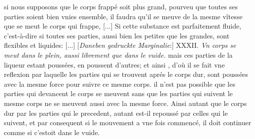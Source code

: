 si nous supposons que le corps frapp\'{e} soit plus grand, pourveu que toutes ses parties soient bien vnies ensemble, il faudra qu'il se meuve de la mesme v\^{i}tesse que se meut le corps qui frappe, [...]
\pend 
\count{}
\pstart 
[p. 76] Si cette substance est parfaitement fluide, c'est-\`{a}-dire si toutes ses parties, aussi bien les petites que les grandes, sont flexibles et liquides: [...] [\textit{Daneben gedruckte Marginalie}:] XXXII. \textit{Vn corps se meut dans le plein, aussi librement que dans le vuide.}
\pend 
\pstart  
[p. 77] [...] mais ces parties de la liqueur estant pouss\'{e}es, en poussent d'autres; et ainsi , d'o\`{u} il se fait vne reflexion par laquelle les parties qui se trouvent apr\'{e}s le corps dur, sont pouss\'{e}es avec la mesme force pour suivre ce mesme corps.
\pend 
\pstart  
[p. 78] [...] il n'est pas possible que les parties qui devancent le corps se meuvent sans que les parties qui suivent le mesme corps ne se meuvent aussi avec la mesme force. Ainsi autant que le corps dur  par les parties qui le precedent, autant est-il repouss\'{e} par celles qui le suivent, et par consequent si le mouvement a vne fois commenc\'{e}, il doit continuer comme si c'estoit dans le vuide.
